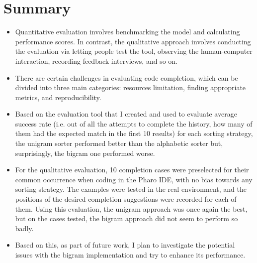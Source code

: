 \section{Summary}
\label{sec:Evaluation-Summary}
\begin{itemize}
    \item Quantitative evaluation involves benchmarking the model and calculating performance scores. In contrast, the qualitative approach involves conducting the evaluation via letting people test the tool, observing the human-computer interaction, recording feedback interviews, and so on.
    \item There are certain challenges in evaluating code completion, which can be divided into three main categories: resources limitation, finding appropriate metrics, and reproducibility.
    \item Based on the evaluation tool that I created and used to evaluate average success rate (i.e. out of all the attempts to complete the history, how many of them had the expected match in the first 10 results) for each sorting strategy, the unigram sorter performed better than the alphabetic sorter but, surprisingly, the bigram one performed worse.
    \item For the qualitative evaluation, 10 completion cases were preselected for their common occurrence when coding in the Pharo IDE, with no bias towards any sorting strategy. The examples were tested in the real environment, and the positions of the desired completion suggestions were recorded for each of them. Using this evaluation, the unigram approach was once again the best, but on the cases tested, the bigram approach did not seem to perform so badly.
    \item Based on this, as part of future work, I plan to investigate the potential issues with the bigram implementation and try to enhance its performance.
\end{itemize}